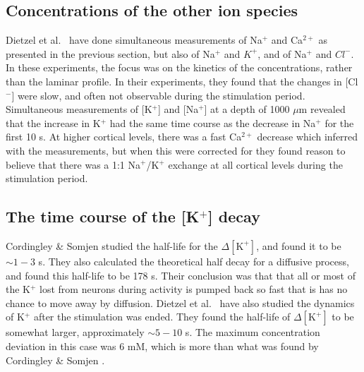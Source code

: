 \documentclass{uiophd}
\begin{document}
\subsection{Concentrations of the other ion species}
 Dietzel et al.\ \cite{Dietzel1982} have done simultaneous measurements of Na$^+$ and Ca$^{2+}$ as presented in the previous section, but also of Na$^+$ and $K^{+}$, and of Na$^+$ and $Cl^{-}$. In these experiments, the focus was on the kinetics of the concentrations, rather than the laminar profile. In their experiments, they found that the changes in [Cl$^-$] were slow, and often not observable during the stimulation period. Simultaneous measurements of [K$^+$] and [Na$^+$] at a depth of 1000 $\mu$m revealed that the increase in K$^+$ had the same time course as the decrease in Na$^+$ for the first 10 s. At higher cortical levels, there was a fast Ca$^{2+}$ decrease which inferred with the measurements, but when this were corrected for they found reason to believe that there was a 1:1 Na$^+$/K$^+$ exchange at all cortical levels during the stimulation period. 
 
\subsection{The time course of the [K$^+$] decay }\label{time course}

Cordingley \& Somjen \cite{CordingleySomjen} studied the half-life for the $\Delta[\text{K}^+]$, and found it to be $\sim 1-3$ s. They also calculated the theoretical half decay for a diffusive process, and found this half-life to be 178 s. Their conclusion was that that all or most
of the K$^+$ lost from neurons during activity is pumped back so fast that is has no
chance to move away by diffusion. Dietzel et al.\ \cite{Dietzel1982} have also studied the dynamics of K$^+$ after the stimulation was ended. They found the half-life of $\Delta [\text{K}^+]$ to be somewhat larger, approximately $\sim 5-10$ s. The maximum concentration deviation in this case was 6 mM, which is more than what was found by Cordingley \& Somjen \cite{CordingleySomjen}.

 
\end{document}

